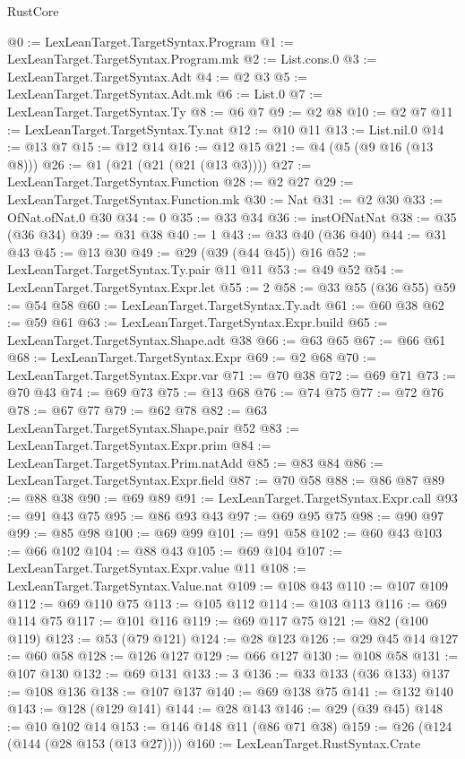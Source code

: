 \begin{lexlean}{RustCore}
\begin{coremodule}
@0 := LexLeanTarget.TargetSyntax.Program
@1 := LexLeanTarget.TargetSyntax.Program.mk
@2 := List.cons.{0}
@3 := LexLeanTarget.TargetSyntax.Adt
@4 := @2 @3
@5 := LexLeanTarget.TargetSyntax.Adt.mk
@6 := List.{0}
@7 := LexLeanTarget.TargetSyntax.Ty
@8 := @6 @7
@9 := @2 @8
@10 := @2 @7
@11 := LexLeanTarget.TargetSyntax.Ty.nat
@12 := @10 @11
@13 := List.nil.{0}
@14 := @13 @7
@15 := @12 @14
@16 := @12 @15
@21 := @4 (@5 (@9 @16 (@13 @8)))
@26 := @1 (@21 (@21 (@21 (@13 @3))))
@27 := LexLeanTarget.TargetSyntax.Function
@28 := @2 @27
@29 := LexLeanTarget.TargetSyntax.Function.mk
@30 := Nat
@31 := @2 @30
@33 := OfNat.ofNat.{0} @30
@34 := 0
@35 := @33 @34
@36 := instOfNatNat
@38 := @35 (@36 @34)
@39 := @31 @38
@40 := 1
@43 := @33 @40 (@36 @40)
@44 := @31 @43
@45 := @13 @30
@49 := @29 (@39 (@44 @45)) @16
@52 := LexLeanTarget.TargetSyntax.Ty.pair @11 @11
@53 := @49 @52
@54 := LexLeanTarget.TargetSyntax.Expr.let
@55 := 2
@58 := @33 @55 (@36 @55)
@59 := @54 @58
@60 := LexLeanTarget.TargetSyntax.Ty.adt
@61 := @60 @38
@62 := @59 @61
@63 := LexLeanTarget.TargetSyntax.Expr.build
@65 := LexLeanTarget.TargetSyntax.Shape.adt @38
@66 := @63 @65
@67 := @66 @61
@68 := LexLeanTarget.TargetSyntax.Expr
@69 := @2 @68
@70 := LexLeanTarget.TargetSyntax.Expr.var
@71 := @70 @38
@72 := @69 @71
@73 := @70 @43
@74 := @69 @73
@75 := @13 @68
@76 := @74 @75
@77 := @72 @76
@78 := @67 @77
@79 := @62 @78
@82 := @63 LexLeanTarget.TargetSyntax.Shape.pair @52
@83 := LexLeanTarget.TargetSyntax.Expr.prim
@84 := LexLeanTarget.TargetSyntax.Prim.natAdd
@85 := @83 @84
@86 := LexLeanTarget.TargetSyntax.Expr.field
@87 := @70 @58
@88 := @86 @87
@89 := @88 @38
@90 := @69 @89
@91 := LexLeanTarget.TargetSyntax.Expr.call
@93 := @91 @43 @75
@95 := @86 @93 @43
@97 := @69 @95 @75
@98 := @90 @97
@99 := @85 @98
@100 := @69 @99
@101 := @91 @58
@102 := @60 @43
@103 := @66 @102
@104 := @88 @43
@105 := @69 @104
@107 := LexLeanTarget.TargetSyntax.Expr.value @11
@108 := LexLeanTarget.TargetSyntax.Value.nat
@109 := @108 @43
@110 := @107 @109
@112 := @69 @110 @75
@113 := @105 @112
@114 := @103 @113
@116 := @69 @114 @75
@117 := @101 @116
@119 := @69 @117 @75
@121 := @82 (@100 @119)
@123 := @53 (@79 @121)
@124 := @28 @123
@126 := @29 @45 @14
@127 := @60 @58
@128 := @126 @127
@129 := @66 @127
@130 := @108 @58
@131 := @107 @130
@132 := @69 @131
@133 := 3
@136 := @33 @133 (@36 @133)
@137 := @108 @136
@138 := @107 @137
@140 := @69 @138 @75
@141 := @132 @140
@143 := @128 (@129 @141)
@144 := @28 @143
@146 := @29 (@39 @45)
@148 := @10 @102 @14
@153 := @146 @148 @11 (@86 @71 @38)
@159 := @26 (@124 (@144 (@28 @153 (@13 @27))))
@160 := LexLeanTarget.RustSyntax.Crate

\end{coremodule}
\end{lexlean}
